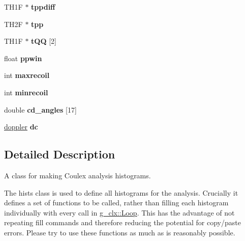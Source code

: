 \begin{DoxyCompactItemize}
\item 
\hypertarget{classhists_a882cee022acf8051bd5c18b0177dcd5e}{T\-H1\-F $\ast$ {\bfseries tppdiff}}\label{classhists_a882cee022acf8051bd5c18b0177dcd5e}

\item 
\hypertarget{classhists_aa38f4682a254eb6873d3ad87677f5275}{T\-H2\-F $\ast$ {\bfseries tpp}}\label{classhists_aa38f4682a254eb6873d3ad87677f5275}

\item 
\hypertarget{classhists_ad4f783d5dd26a2fb7c4c314035710688}{T\-H1\-F $\ast$ {\bfseries t\-Q\-Q} \mbox{[}2\mbox{]}}\label{classhists_ad4f783d5dd26a2fb7c4c314035710688}

\item 
\hypertarget{classhists_af469b4438ba88b1af6df026c9dff4928}{float {\bfseries ppwin}}\label{classhists_af469b4438ba88b1af6df026c9dff4928}

\item 
\hypertarget{classhists_aee1035f05bda36071913fc087f8ef80f}{int {\bfseries maxrecoil}}\label{classhists_aee1035f05bda36071913fc087f8ef80f}

\item 
\hypertarget{classhists_ab46b91f1c6cbd9bff55649ee709a95e8}{int {\bfseries minrecoil}}\label{classhists_ab46b91f1c6cbd9bff55649ee709a95e8}

\item 
\hypertarget{classhists_af9ae33bfde7848988faf5941f429d404}{double {\bfseries cd\-\_\-angles} \mbox{[}17\mbox{]}}\label{classhists_af9ae33bfde7848988faf5941f429d404}

\item 
\hypertarget{classhists_a5bb6611932e44875a143ccd7812ce712}{\hyperlink{classdoppler}{doppler} {\bfseries dc}}\label{classhists_a5bb6611932e44875a143ccd7812ce712}

\end{DoxyCompactItemize}


\subsection{Detailed Description}
A class for making Coulex analysis histograms. 

The hists class is used to define all histograms for the analysis. Crucially it defines a set of functions to be called, rather than filling each histogram individually with every call in \hyperlink{classg__clx_a9d5de859df4bfbb746726661ff1d24a9}{g\-\_\-clx\-::\-Loop}. This has the advantage of not repeating fill commands and therefore reducing the potential for copy/paste errors. Please try to use these functions as much as is reasonably possible. 

